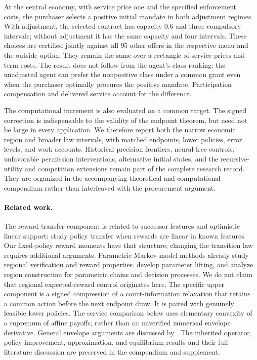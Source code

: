 At the central economy, with service price one and the specified enforcement costs, the purchaser selects a positive initial mandate in both adjustment regimes. With adjustment, the selected contract has capacity $0.6$ and three compulsory intervals; without adjustment it has the same capacity and four intervals. These choices are certified jointly against all 95 other offers in the respective menu and the outside option. They remain the same over a rectangle of service prices and term costs. The result does not follow from the agent's class ranking: the unadjusted agent can prefer the nonpositive class under a common grant even when the purchaser optimally procures the positive mandate. Participation compensation and delivered service account for the difference.

The computational increment is also evaluated on a common target. The signed correction is indispensable to the validity of the endpoint theorem, but need not be large in every application. We therefore report both the narrow economic region and broader law intervals, with matched endpoints, lower policies, error levels, and work accounts. Historical precision frontiers, neural-free controls, unfavorable permission interventions, alternative initial states, and the recursive-utility and competition extensions remain part of the complete research record. They are organized in the accompanying theoretical and computational compendium rather than interleaved with the procurement argument.

\paragraph{Related work.} The reward-transfer component is related to successor features and optimistic linear support: \citet{alegre2022} study policy transfer when rewards are linear in known features. Our fixed-policy reward moments have that structure; changing the transition law requires additional arguments. Parametric Markov-model methods already study regional verification and reward properties. \citet{quatmann2016} develop parameter lifting, and \citet{junges2019} analyze region construction for parametric chains and decision processes. We do not claim that regional expected-reward control originates here. The specific upper component is a signed compression of a count-information relaxation that retains a common action before the next endpoint draw. It is paired with genuinely feasible lower policies. The service comparison below uses elementary convexity of a supremum of affine payoffs, rather than an unverified numerical envelope derivative. General envelope arguments are discussed by \citet{milgrom2002}. The inherited operator, policy-improvement, approximation, and equilibrium results and their full literature discussion are preserved in the compendium and supplement.

